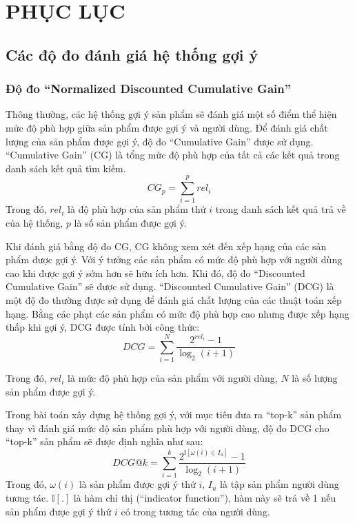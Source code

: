 \appendix

\chapter{PHỤC LỤC}
\label{Appendix1}
\graphicspath{{Appendix/AppendixFigs/}}
\section{Các độ đo đánh giá hệ thống gợi ý}
\label{chap_metrics}
\subsection{Độ đo ``Normalized Discounted Cumulative Gain''}
    Thông thường, các hệ thống gợi ý sản phẩm sẽ đánh giá một số điểm thể hiện mức độ phù hợp giữa sản phẩm được gợi ý và người dùng. Để đánh giá chất lượng của sản phẩm được gợi ý, độ đo ``Cumulative Gain'' được sử dụng. 
    ``Cumulative Gain'' (CG) là tổng mức độ phù hợp của tất cả các kết quả trong danh sách kết quả tìm kiếm. 
    \begin{equation}
        CG_p = \sum_{i=1}^p rel_i
    \end{equation}
    Trong đó, $rel_i$ là độ phù hợp của sản phẩm thứ $i$ trong danh sách kết quả trả về của hệ thống, $p$ là số sản phẩm được gợi ý.

    Khi đánh giá bằng độ đo CG, CG không xem xét đến xếp hạng của các sản phẩm được gợi ý. Với ý tưởng các sản phẩm có mức độ phù hợp với người dùng cao khi được gợi ý sớm hơn sẽ hữu ích hơn. 
    Khi đó, độ đo ``Discounted Cumulative Gain'' sẽ được sử dụng. 
    ``Discounted Cumulative Gain'' (DCG) là một độ đo thường được sử dụng để đánh giá chất lượng của các thuật toán xếp hạng. Bằng các phạt các sản phẩm có mức độ phù hợp cao nhưng được xếp hạng thấp khi gợi ý, DCG được tính bởi công thức:
    \begin{equation}
        DCG = \sum_{i = 1}^{N} \frac{2^{rel_i} - 1}{\log_2 (i + 1)}
    \end{equation}
    
    Trong đó, $rel_i$ là mức độ phù hợp của sản phẩm với người dùng, $N$ là số lượng sản phẩm được gợi ý.

    Trong bài toán xây dựng hệ thống gợi ý, với mục tiêu đưa ra ``top-k'' sản phẩm thay vì đánh giá mức độ sản phẩm phù hợp với người dùng, độ đo DCG cho ``top-k'' sản phẩm sẽ được định nghĩa như sau:
    \begin{equation}
        DCG@k = \sum_{i = 1}^k \frac{2^{\mathbb{I}[\omega(i) \in I_u]} - 1}{\log_2(i + 1)}
    \end{equation}
    Trong đó, $\omega(i)$ là sản phẩm được gợi ý thứ $i$, $I_u$ là tập sản phẩm người dùng tương tác. $\mathbb{I}[.]$ là hàm chỉ thị (``indicator function''), hàm này sẽ trả về 1 nếu sản phẩm được gợi ý thứ $i$ có trong tương tác của người dùng. 

